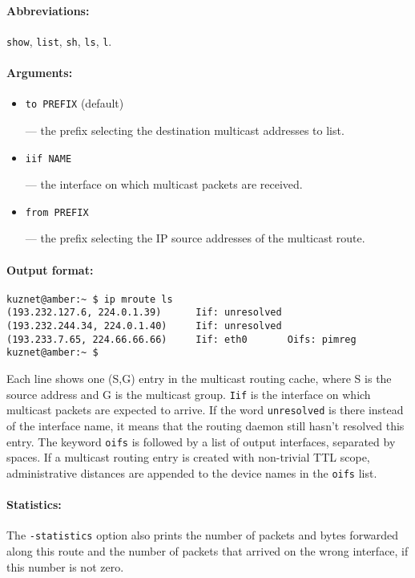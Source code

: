 \paragraph{Abbreviations:} \verb|show|, \verb|list|, \verb|sh|, \verb|ls|, \verb|l|.

\paragraph{Arguments:}

\begin{itemize}
\item \verb|to PREFIX| (default)

--- the prefix selecting the destination multicast addresses to list.


\item \verb|iif NAME|

--- the interface on which multicast packets are received.


\item \verb|from PREFIX|

--- the prefix selecting the IP source addresses of the multicast route.


\end{itemize}

\paragraph{Output format:}

\begin{verbatim}
kuznet@amber:~ $ ip mroute ls
(193.232.127.6, 224.0.1.39)      Iif: unresolved 
(193.232.244.34, 224.0.1.40)     Iif: unresolved 
(193.233.7.65, 224.66.66.66)     Iif: eth0       Oifs: pimreg 
kuznet@amber:~ $ 
\end{verbatim}

Each line shows one (S,G) entry in the multicast routing cache,
where S is the source address and G is the multicast group. \verb|Iif| is
the interface on which multicast packets are expected to arrive.
If the word \verb|unresolved| is there instead of the interface name,
it means that the routing daemon still hasn't resolved this entry.
The keyword \verb|oifs| is followed by a list of output interfaces, separated
by spaces. If a multicast routing entry is created with non-trivial
TTL scope, administrative distances are appended to the device names
in the \verb|oifs| list.

\paragraph{Statistics:} The \verb|-statistics| option also prints the
number of packets and bytes forwarded along this route and
the number of packets that arrived on the wrong interface, if this number is not zero.

